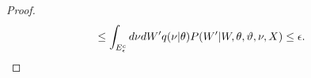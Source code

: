 \begin{proof}
\begin{align*}
  &\le \int_{E^c_{\epsilon}} d\nu dW'
  q(\nu | \theta) P(W' | W, \theta, \vartheta, \nu, X) \le \epsilon.
\end{align*}

\end{proof}
